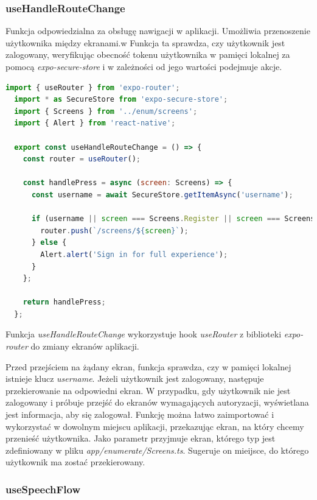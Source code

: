 \subsubsection{useHandleRouteChange} 

Funkcja odpowiedzialna za obsługę nawigacji w aplikacji. Umożliwia przenoszenie użytkownika między ekranami.w Funkcja ta sprawdza, czy użytkownik jest zalogowany, weryfikując obecność tokenu użytkownika w pamięci lokalnej za pomocą \textit{expo-secure-store} i w zależności od jego wartości podejmuje akcje.
      
\begin{lstlisting}[language=JavaScript, caption=useHandleRouteChangeHook, label=lst:router]
  import { useRouter } from 'expo-router';
  import * as SecureStore from 'expo-secure-store';
  import { Screens } from '../enum/screens';
  import { Alert } from 'react-native';

  export const useHandleRouteChange = () => {
    const router = useRouter();

    const handlePress = async (screen: Screens) => {
      const username = await SecureStore.getItemAsync('username');

      if (username || screen === Screens.Register || screen === Screens.Login) {
        router.push(`/screens/${screen}`);
      } else {
        Alert.alert('Sign in for full experience');
      }
    };

    return handlePress;
  };
\end{lstlisting}
      
Funkcja \textit{useHandleRouteChange} wykorzystuje hook \textit{useRouter} z biblioteki \textit{expo-router} do zmiany ekranów aplikacji. 

Przed przejściem na żądany ekran, funkcja sprawdza, czy w pamięci lokalnej istnieje klucz \textit{username}. Jeżeli użytkownik jest zalogowany, następuje przekierowanie na odpowiedni ekran. W przypadku, gdy użytkownik nie jest zalogowany i próbuje przejść do ekranów wymagających autoryzacji, wyświetlana jest informacja, aby się zalogował. Funkcję można łatwo zaimportować i wykorzystać w dowolnym miejscu aplikacji, przekazując ekran, na który chcemy przenieść użytkownika. Jako parametr przyjmuje ekran, którego typ jest zdefiniowany w pliku \textit{app/enumerate/Screens.ts}. Sugeruje on mieijsce, do którego użytkownik ma zostać przekierowany.

\subsubsection{useSpeechFlow} 

